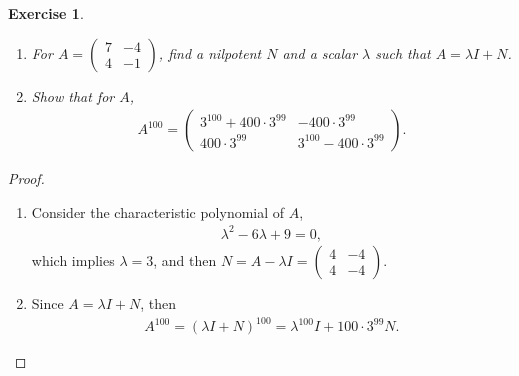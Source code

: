 \documentclass[10pt]{book}
\newtheorem{exercise}{Exercise}[section]
\theoremstyle{definition}
\numberwithin{equation}{chapter}
\begin{document}
\begin{exercise}
~\begin{enumerate}[label=(\alph*)]
    \item For $A = \begin{pmatrix}
        7 & -4 \\
        4 & -1
    \end{pmatrix}$, find a nilpotent $N$ and a scalar $\lambda$ such that $A = \lambda I + N$.
    
    \item Show that for $A$, 
    \begin{align*}
        A^{100} = \begin{pmatrix}
        3^{100} + 400\cdot 3^{99} & -400 \cdot 3^{99} \\
        400 \cdot 3^{99} & 3^{100} - 400 \cdot 3^{99}
    \end{pmatrix}.
    \end{align*}
\end{enumerate}
\end{exercise}
\begin{proof}
~\begin{enumerate}[label=(\alph*)]
    \item Consider the characteristic polynomial of $A$,
    \begin{align*}
        \lambda^2 - 6 \lambda + 9 = 0,
    \end{align*}
    which implies $\lambda = 3$, and then $N = A - \lambda I = \begin{pmatrix}
        4 & -4 \\
        4 & -4
    \end{pmatrix}$.
    
    \item Since $A = \lambda I + N$, then
    \begin{align*}
        A^{100} = (\lambda I + N)^{100} = \lambda^{100}I + 100 \cdot 3^{99} N.
    \end{align*}
\end{enumerate}
\end{proof}

\medskip
\end{document}
